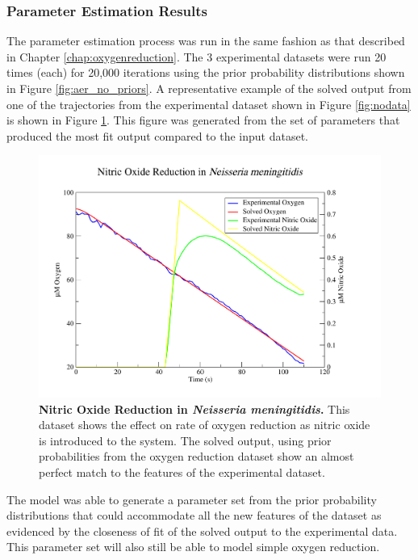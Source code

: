\subsubsection{Parameter Estimation Results}
The parameter estimation process was run in the same fashion as that described in Chapter \ref{chap:oxygenreduction}. The 3 experimental datasets were run 20 times (each) for 20,000 iterations using the prior probability distributions shown in Figure \ref{fig:aer_no_priors}. A representative example of the solved output from one of the trajectories from the experimental dataset shown in Figure \ref{fig:nodata} is shown in Figure \ref{fig:nosim}. This figure was generated from the set of parameters that produced the most fit output compared to the input dataset.
\begin{figure}[tbp]
 \centering
 \includegraphics[width=14cm, trim=1cm 1cm 3cm 1cm, clip=true]{./06-noreduction/data/aer-no-sim1.pdf}
 \caption[{Nitric Oxide Reduction in \textit{Neisseria meningitidis}.}]{{\bf Nitric Oxide Reduction in \textit{Neisseria meningitidis}.} This dataset shows the effect on rate of oxygen reduction as nitric oxide is introduced to the system. The solved output, using prior probabilities from the oxygen reduction dataset show an almost perfect match to the features of the experimental dataset.}
 \label{fig:nosim}
\end{figure}
The model was able to generate a parameter set from the prior probability distributions that could accommodate all the new features of the dataset as evidenced by the closeness of fit of the solved output to the experimental data. This parameter set will also still be able to model simple oxygen reduction.
